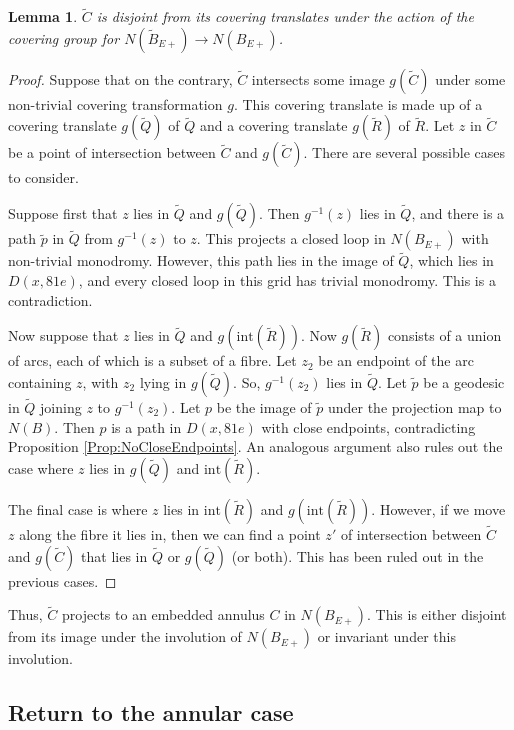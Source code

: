 \documentclass[oneside]{amsart}
\numberwithin{equation}{section}
\theoremstyle{plain}
\newtheorem{lemma}[equation]{Lemma}
\theoremstyle{definition}
\begin{document}
\begin{lemma}
\label{Lem:AnnulusDisjointFromTranslates}
$\tilde C$ is disjoint from its covering translates under the action of the covering group for $N(\tilde B_{E+}) \rightarrow N(B_{E+})$.
\end{lemma}

\begin{proof}
Suppose that on the contrary, $\tilde C$ intersects some image $g(\tilde C)$ under some non-trivial covering transformation $g$.
This covering translate is made up of a covering translate $g(\tilde Q)$ of $\tilde Q$ and 
a covering translate $g(\tilde R)$ of $\tilde R$. Let $z$ in $\tilde C$ be a point of intersection between
$\tilde C$ and $g(\tilde C)$. There are several possible cases to consider.

Suppose first that $z$ lies in $\tilde Q$ and $g(\tilde Q)$. Then $g^{-1}(z)$ lies in $\tilde Q$,
and there is a path $\tilde p$ in $\tilde Q$ from $g^{-1}(z)$ to $z$. This projects
a closed loop in $N(B_{E+})$ with non-trivial monodromy. However,
this path lies in the image of $\tilde Q$, which lies in $D(x,81e)$, and 
every closed loop in this grid has trivial monodromy.
This is a contradiction.

Now suppose that $z$ lies in $\tilde Q$ and $g(\mathrm{int}(\tilde R))$. Now $g(\tilde R)$ consists of a union of arcs,
each of which is a subset of a fibre. Let $z_2$ be an endpoint of the arc containing $z$, with $z_2$ lying in $g(\tilde Q)$. 
So, $g^{-1}(z_2)$ lies in $\tilde Q$. Let $\tilde p$ be a geodesic
in $\tilde Q$ joining $z$ to $g^{-1}(z_2)$. Let $p$ be the image of $\tilde p$ under the
projection map to $N(B)$. Then $p$ is a path in $D(x,81e)$ with close endpoints, contradicting
Proposition \ref{Prop:NoCloseEndpoints}. An analogous argument also rules out the case
where $z$ lies in $g(\tilde Q)$ and $\mathrm{int}(\tilde R)$.

The final case is where $z$ lies in $\mathrm{int}(\tilde R)$ and $g(\mathrm{int}(\tilde R))$.
However, if we move $z$ along the fibre it lies in, then we can find a point $z'$
of intersection between $\tilde C$ and $g(\tilde C)$ that lies in $\tilde Q$ or $g(\tilde Q)$ (or both).
This has been ruled out in the previous cases.
\end{proof}

Thus, $\tilde C$ projects to an embedded annulus $C$ in $N(B_{E+})$. This is either disjoint from its
image under the involution of $N(B_{E+})$ or invariant under this involution.


\subsection{Return to the annular case}
\end{document}

